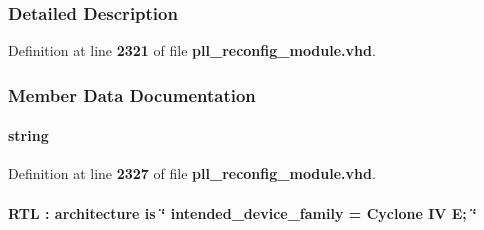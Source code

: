 \subsubsection{Detailed Description}


Definition at line {\bf 2321} of file {\bf pll\+\_\+reconfig\+\_\+module.\+vhd}.



\subsubsection{Member Data Documentation}
\paragraph[{clearbox\+\_\+defparam}]{ {\bfseries \textcolor{comment}{string}\textcolor{vhdlchar}{ }} \hspace{0.3cm}{\ttfamily [Attribute]}}\label{classpll__reconfig__module_1_1RTL_ae86882188b45fb04d79f3cdc3f7f9848}


Definition at line {\bf 2327} of file {\bf pll\+\_\+reconfig\+\_\+module.\+vhd}.

\paragraph[{clearbox\+\_\+defparam}]{ {\bfseries \textcolor{vhdlchar}{R\+TL}\textcolor{vhdlchar}{ }\textcolor{vhdlchar}{\+:}\textcolor{vhdlchar}{ }\textcolor{keywordflow}{architecture}\textcolor{vhdlchar}{ }\textcolor{keywordflow}{is}\textcolor{vhdlchar}{ }\textcolor{vhdlchar}{ }\textcolor{vhdlchar}{ }\textcolor{vhdlchar}{ }\textcolor{keyword}{\char`\"{} intended\+\_\+device\+\_\+family = Cyclone I\+V E; \char`\"{}}\textcolor{vhdlchar}{ }} \hspace{0.3cm}{\ttfamily [Attribute]}}\label{classpll__reconfig__module_1_1RTL_ac64c6bca8cd8d7a308693e7eb27df7a7}


